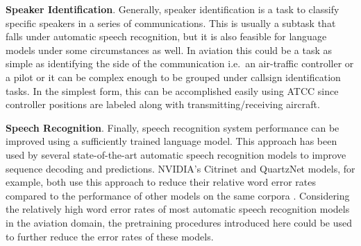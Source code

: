 \documentclass[12pt]{article}
\begin{document}
\textbf{Speaker Identification}. Generally, speaker identification is a task to classify specific speakers in a series of communications. This is
usually a subtask that falls under automatic speech recognition, but it is also feasible for language models under some circumstances as well. In
aviation this could be a task as simple as identifying the side of the communication i.e.~an air-traffic controller or a pilot or it can be complex
enough to be grouped under callsign identification tasks. In the simplest form, this can be accomplished easily using ATCC since controller positions
are labeled along with transmitting/receiving aircraft.

\textbf{Speech Recognition}. Finally, speech recognition system performance can be improved using a sufficiently trained language model. This approach
has been used by several state-of-the-art automatic speech recognition models to improve sequence decoding and predictions. NVIDIA's Citrinet and
QuartzNet models, for example, both use this approach to reduce their relative word error rates compared to the performance of other models on the
same corpora \cite{majumdar_citrinet_2021,kriman_quartznet_2020}. Considering the relatively high word error rates of most automatic speech
recognition models in the aviation domain, the pretraining procedures introduced here could be used to further reduce the error rates of these models.

\newpage


\end{document}
